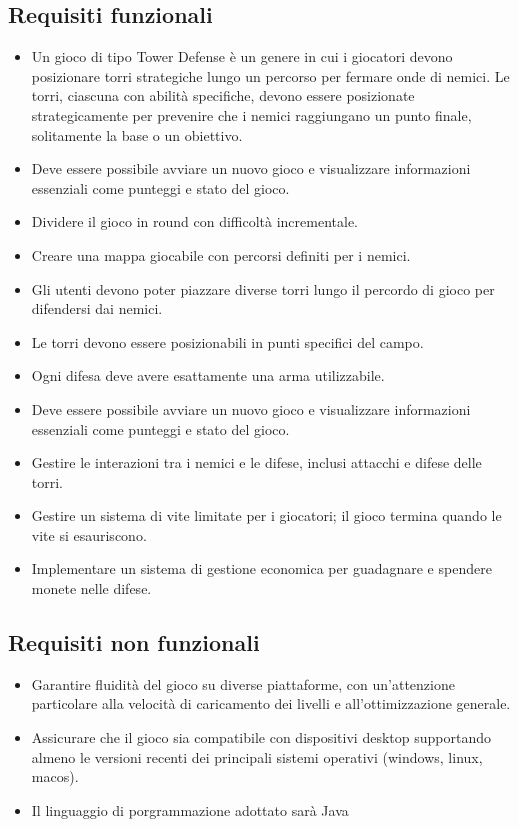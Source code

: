 \documentclass[a4paper,12pt]{report}
\begin{document}
\subsection*{Requisiti funzionali}
\begin{itemize}
	\item Un gioco di tipo Tower Defense è un genere in cui i giocatori devono posizionare torri strategiche lungo un percorso per fermare onde di nemici. Le torri, ciascuna con abilità specifiche, devono essere posizionate strategicamente per prevenire che i nemici raggiungano un punto finale, solitamente la base o un obiettivo.
	\item Deve essere possibile avviare un nuovo gioco e visualizzare informazioni essenziali come punteggi e stato del gioco.
	\item Dividere il gioco in round con difficoltà incrementale.
	\item Creare una mappa giocabile con percorsi definiti per i nemici.
	\item Gli utenti devono poter piazzare diverse torri lungo il percordo di gioco per difendersi dai nemici.
	\item Le torri devono essere posizionabili in punti specifici del campo.
	\item Ogni difesa deve avere esattamente una arma utilizzabile.
	\item Deve essere possibile avviare un nuovo gioco e visualizzare informazioni essenziali come punteggi e stato del gioco.
	\item Gestire le interazioni tra i nemici e le difese, inclusi attacchi e difese delle torri.
	\item Gestire un sistema di vite limitate per i giocatori; il gioco termina quando le vite si esauriscono.
	\item Implementare un sistema di gestione economica per guadagnare e spendere monete nelle difese.
\end{itemize}

\subsection*{Requisiti non funzionali}
\begin{itemize}
	\item Garantire fluidità del gioco su diverse piattaforme, con un'attenzione particolare alla velocità di caricamento dei livelli e all'ottimizzazione generale.
	\item Assicurare che il gioco sia compatibile con dispositivi desktop supportando almeno le versioni recenti dei principali sistemi operativi (windows, linux, macos).
	\item Il linguaggio di porgrammazione adottato sarà Java
\end{itemize}
\end{document}
